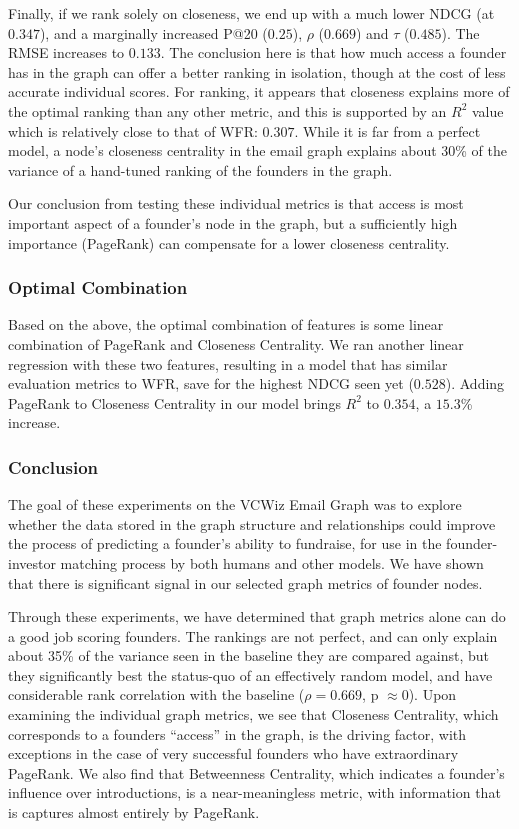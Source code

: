 Finally, if we rank solely on closeness, we end up with a much lower NDCG (at $0.347$), and a marginally increased P@20 ($0.25$), $\rho$ ($0.669$) and $\tau$ ($0.485$). The RMSE increases to $0.133$. The conclusion here is that how much access a founder has in the graph can offer a better ranking in isolation, though at the cost of less accurate individual scores. For ranking, it appears that closeness explains more of the optimal ranking than any other metric, and this is supported by an $R^2$ value which is relatively close to that of WFR: $0.307$. While it is far from a perfect model, a node's closeness centrality in the email graph explains about 30\% of the variance of a hand-tuned ranking of the founders in the graph.

Our conclusion from testing these individual metrics is that access is most important aspect of a founder's node in the graph, but a sufficiently high importance (PageRank) can compensate for a lower closeness centrality.

\subsubsection{Optimal Combination}

Based on the above, the optimal combination of features is some linear combination of PageRank and Closeness Centrality. We ran another linear regression with these two features, resulting in a model that has similar evaluation metrics to WFR, save for the highest NDCG seen yet ($0.528$). Adding PageRank to Closeness Centrality in our model brings $R^2$ to $0.354$, a $15.3$\% increase.

\subsubsection{Conclusion}

The goal of these experiments on the VCWiz Email Graph was to explore whether the data stored in the graph structure and relationships could improve the process of predicting a founder's ability to fundraise, for use in the founder-investor matching process by both humans and other models. We have shown that there is significant signal in our selected graph metrics of founder nodes.

Through these experiments, we have determined that graph metrics alone can do a good job scoring founders. The rankings are not perfect, and can only explain about 35\% of the variance seen in the baseline they are compared against, but they significantly best the status-quo of an effectively random model, and have considerable rank correlation with the baseline ($\rho = 0.669$, p $\approx 0$). Upon examining the individual graph metrics, we see that Closeness Centrality, which corresponds to a founders ``access'' in the graph, is the driving factor, with exceptions in the case of very successful founders who have extraordinary PageRank. We also find that Betweenness Centrality, which indicates a founder's influence over introductions, is a near-meaningless metric, with information that is captures almost entirely by PageRank.

